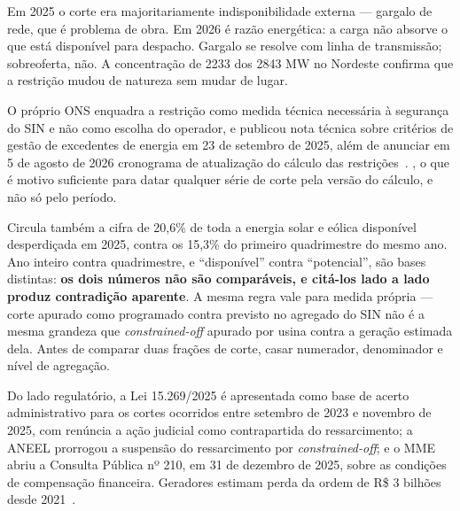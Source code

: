 \documentclass[10pt,a4paper,oneside]{book}
\begin{document}

\vspace{0.6em}
Em 2025 o corte era majoritariamente indisponibilidade externa --- gargalo de
rede, que é problema de obra. Em 2026 é razão energética: a carga não absorve o
que está disponível para despacho. Gargalo se resolve com linha de transmissão;
sobreoferta, não. A concentração de \num{2233} dos \num{2843} MW no Nordeste
confirma que a restrição mudou de natureza sem mudar de lugar.

O próprio ONS enquadra a restrição como medida técnica necessária à segurança
do SIN e não como escolha do operador, e publicou nota técnica sobre critérios
de gestão de excedentes de energia em 23 de setembro de 2025, além de anunciar
em 5 de agosto de 2026 cronograma de atualização do cálculo das
restrições~\cite{onsfaq}. , o que é motivo
suficiente para datar qualquer série de corte pela versão do cálculo, e não só
pelo período.

\begin{objecao}
Circula também a cifra de 20,6\% de toda a energia solar e eólica disponível
desperdiçada em 2025, contra os 15,3\% do primeiro quadrimestre do mesmo ano.
Ano inteiro contra quadrimestre, e ``disponível'' contra ``potencial'', são
bases distintas: \textbf{os dois números não são comparáveis, e citá-los lado a
lado produz contradição aparente}. A mesma regra vale para medida própria ---
corte apurado como programado contra previsto no agregado do SIN não é a mesma
grandeza que \emph{constrained-off} apurado por usina contra a geração estimada
dela. Antes de comparar duas frações de corte, casar numerador, denominador e
nível de agregação.
\end{objecao}

Do lado regulatório, a Lei 15.269/2025 é apresentada como base de acerto
administrativo para os cortes ocorridos entre setembro de 2023 e novembro de
2025, com renúncia a ação judicial como contrapartida do ressarcimento; a ANEEL
prorrogou a suspensão do ressarcimento por \emph{constrained-off}; e o MME abriu
a Consulta Pública nº 210, em 31 de dezembro de 2025, sobre as condições de
compensação financeira. Geradores estimam perda da ordem de R\$ 3 bilhões desde
2021~\cite{tagd2026,canalenergia2026}.
\end{document}
